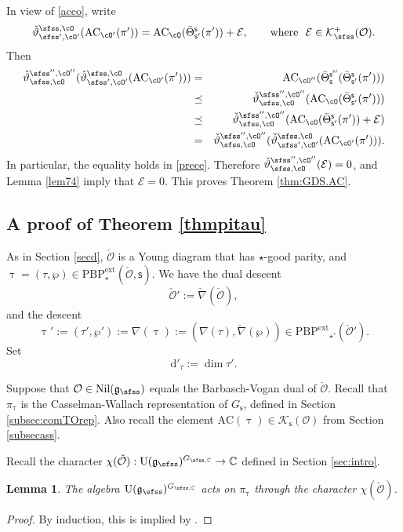 \documentclass[12pt,a4paper]{amsart}
\newcommand{\CE}{{\mathcal {E}}}
\newcommand{\CK}{{\mathcal {K}}}
\newcommand{\CO}{{\mathcal {O}}}
\newcommand{\oU}{\operatorname{U}}
\newcommand{\g}{\mathfrak g}
\def\DD{\nabla}
\numberwithin{equation}{section}
\newtheorem{lem}[thm]{Lemma}
\theoremstyle{remark}
\def\Thetab{\bar{\Theta}}
\def\PBPe{\mathrm{PBP}^{\mathrm{ext}}}
\def\ckDD{{\check\DD}}
\begin{document}
In view of \eqref{acco}, write
\[
  \check \vartheta_{\sfss', \cO'}^{\sfss, \cO}(\mathrm{AC}_{\cO'}(\pi'))=\mathrm{AC}_{\cO}( \Thetab_{\mathsf s'}^{\mathsf s}(\pi'))+\CE,\qquad\textrm{where $\ \CE\in \CK^+_\sfss(\CO)$}.
\]
Then
\begin{eqnarray}
\nonumber \check \vartheta_{\sfss, \cO}^{\sfss'', \cO''}(\check \vartheta_{\sfss', \cO'}^{\sfss, \cO}(\mathrm{AC}_{\cO'}(\pi')))
\nonumber &=&\mathrm{AC}_{\cO''}( \Thetab_{\mathsf s}^{\mathsf s''}(\Thetab_{\mathsf s'}^{\mathsf s}(\pi')))\\
\nonumber &\preceq &  \check \vartheta_{\sfss, \cO}^{\sfss'', \cO''}(\mathrm{AC}_{\cO}( \Thetab_{\mathsf s'}^{\mathsf s}(\pi')))\\
\label{prece}  &\preceq &  \check \vartheta_{\sfss, \cO}^{\sfss'', \cO''}(\mathrm{AC}_{\cO}( \Thetab_{\mathsf s'}^{\mathsf s}(\pi'))+\CE)\\
\nonumber &=&\check \vartheta_{\sfss, \cO}^{\sfss'', \cO''}(\check \vartheta_{\sfss', \cO'}^{\sfss, \cO}(\mathrm{AC}_{\cO'}(\pi'))).
\end{eqnarray}
In particular,  the equality holds in \eqref{prece}. Therefore  $\check \vartheta_{\sfss, \cO}^{\sfss'', \cO''}(\CE)=0$, and
Lemma \ref{lem74} imply that $\CE=0$. This proves Theorem \ref{thm:GDS.AC}.




 \subsection{A proof of Theorem \ref{thmpitau} }\label{sec:comANDgeo}
  As in Section \ref{secd}, $\check \CO$ is a Young diagram that has $\star$-good parity,   and
$\uptau=(\tau, \wp)\in \PBPe_\star(\check \CO,\mathsf s)$.  We have the dual descent
\[
  \check \CO':=\check \nabla(\check \CO),
\]
and the descent
 \[
  \uptau' := (\tau',\wp'):=\nabla(\uptau):= (\DD(\tau), \ckDD(\wp))\in \mathrm{\PBPe}_{\star'}(\check \CO').
 \]
 Set
 \[
  \mathrm d'_\tau:=
    \dim \tau'.
    \]

Suppose that $\CO\in \mathrm{Nil}(\g_\sfss)$ equals the Barbasch-Vogan dual of $\check \CO$.   Recall that $\pi_\uptau$ is the Casselman-Wallach representation of $G_{\mathsf s}$, defined in Section \ref{subsec:comTOrep}.
Also recall the element $\mathrm{AC}(\uptau)\in \CK_{\mathsf s}(\CO)$ from Section \ref{subsecass}.

Recall the character $\chi(\check \CO): \oU(\g_\sfss)^{G_{\sfss, \C}}\rightarrow \C$  defined in Section \ref{sec:intro}.
\begin{lem}\label{inf1}
The algebra $\oU(\g_\sfss)^{G_{\sfss, \C}}$ acts on $\pi_\uptau$ through the character $\chi(\check \CO)$.%
\end{lem}
\begin{proof}
By induction, this is implied by \cite[Theorem
1.19]{PrzInf}.
\end{proof}
\end{document}
